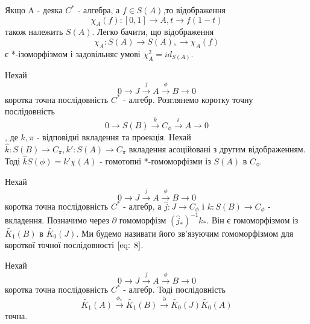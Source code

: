 Якщо A - деяка $C^*$ - алгебра, а $f \in S(A)$,то відображення
\begin{equation*}
    \chi_A(f): [0,1] \to A, t \to f(1 - t)
\end{equation*}
також належить $S(A)$.
Легко бачити, що відображення
\begin{equation*}
    \chi_A: S(A) \to S(A),  \to \chi_A(f)
\end{equation*}
є *-ізоморфізмом і задовільняє умові $\chi_A^2 = id_{S(A)}$.
\begin{lemma}
    Нехай
    \begin{equation*}
        0 \to J \xrightarrow{j} A \xrightarrow{\phi} B \to 0
    \end{equation*}
    коротка точна послідовність $C^*$ - алгебр.
    Розглянемо коротку точну \\ послідовність
    \begin{equation*}
        0 \to S(B) \xrightarrow{k} C_\phi \xrightarrow{\pi} A \to 0
    \end{equation*},
    де $k, \pi$ - відповідні вкладення та проекція.
    Нехай $\hat{k}: S(B) \to C_{\pi}, k': S(A) \to C_\pi$ вкладення асоційовані з другим відображенням.
    Тоді $\hat{k}S(\phi) = k' \chi(A)$ - гомотопні *-гомоморфізми із $S(A)$ в $C_\phi$.
\end{lemma}

Нехай
\begin{equation}
    \label{eq: 8}
    0 \to J \xrightarrow{j} A \xrightarrow{\phi} B \to 0
\end{equation}
коротка точна послідовність $C^*$ - алгебр, а $\hat{j}: J \to C_\phi$ і $k: S(B) \to C_\phi$ - вкладення.
Позначимо через $\partial$ гомоморфізм $(\hat{j}_*)^{-1}k_*$.
Він є гомоморфізмом із $\widetilde{K_1}(B)$ в $\widetilde{K_0}(J)$.
Ми будемо називати його зв'язуючим гомоморфізмом для короткої точної послідовності $\ref{eq: 8}$.
\begin{theorem}
    Нехай
    \begin{equation}
        \label{eq: 8}
        0 \to J \xrightarrow{j} A \xrightarrow{\phi} B \to 0
    \end{equation}
    коротка точна послідовність $C^*$ - алгебр.
    Тоді послідовність
    \begin{equation*}
        \widetilde{K_1}(A) \xrightarrow{\phi_*} \widetilde{K_1}(B) \xrightarrow{\partial} \widetilde{K_0}(J) \widetilde{K_0}(A)
    \end{equation*}
    точна.
\end{theorem}

